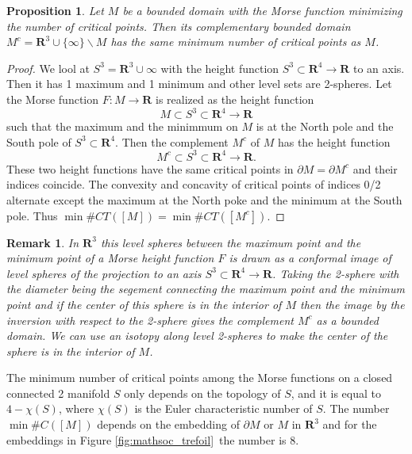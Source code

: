 \documentclass{amsart}
\newtheorem{proposition}[theorem]{Proposition}
\newtheorem{remark}[theorem]{Remark}
\numberwithin{equation}{section}
\newcommand{\RR}{{\boldsymbol{R}}}
\newcommand{\lra}{\longrightarrow}
\newcommand{\bd}{\partial}
\newcommand{\ssm}{\smallsetminus}
\begin{document}
\begin{proposition}\label{prop:complement}
Let $M$ be a bounded domain with the Morse function minimizing the number of critical points. Then its complementary bounded domain $M^c=\RR^3\cup \{\infty\} \ssm M$ has the same minimum number of critical points as $M$.
\end{proposition}
\begin{proof}
We lool at $S^3=\RR^3\cup\infty$ with the height function $S^3\subset\RR^4 \lra \RR$ to an axis. Then it has 1 maximum and 1 minimum and other level sets are 2-spheres. 
Let the Morse function $F:M\lra \RR$ is realized as the height function $$M\subset S^3\subset\RR^4 \lra \RR$$ such that the maximum and the minimmum on $M$ is at the  North pole and the South pole of $S^3\subset\RR^4$. Then the complement $M^c$ of $M$ has  the height function $$M^c\subset S^3\subset\RR^4 \lra \RR.$$
These two height functions have the same critical points in $\bd M=\bd M^c$ and their indices coincide. The convexity and concavity of critical points of indices 0/2 alternate except the maximum at the North poke and the minimum at the South pole. Thus $\min\#CT([M])=\min\#CT([M^c])$. 
\end{proof}

\begin{remark}
In $\RR^3$ this level spheres between the maximum point and the minimum point of a Morse height function $F$ is drawn as a conformal image of level spheres of 
the projection to an axis $S^3\subset \RR^4\lra \RR$. Taking the 2-sphere with the diameter being the segement connecting the maximum point and the minimum point and if the center of this sphere is in the interior of $M$ then the image by the inversion with respect to the 2-sphere gives the complement $M^c$ as a bounded domain. We can use an isotopy along level 2-spheres to make the center of the sphere is in the interior of $M$.
\end{remark}

The minimum number of critical points among the Morse functions on a closed connected 2 manifold $S$ only depends on the topology of $S$, and it is equal to $4-\chi(S)$, where $\chi(S)$ is the Euler characteristic number of $S$. The number $\min\#C([M])$ depends on the embedding of $\bd M$ or $M$ in $\RR^3$ and for the embeddings in Figure \ref{fig:mathsoc_trefoil}\  the number is 8.
\end{document}
